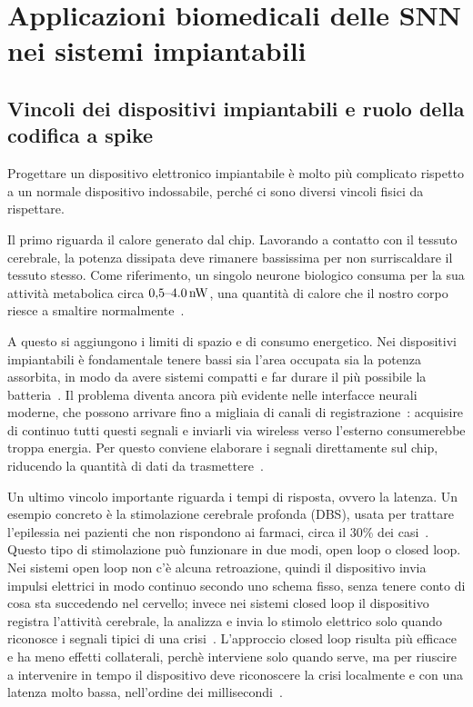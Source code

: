 \section[Applicazioni biomedicali impiantabili]{Applicazioni biomedicali delle SNN nei sistemi impiantabili}
\label{sec:applicazioni}

\subsection{Vincoli dei dispositivi impiantabili e ruolo della codifica a spike}
\label{subsec:vincoli_impiantabili}


Progettare un dispositivo elettronico impiantabile è molto più complicato rispetto a un normale dispositivo indossabile, perché ci sono diversi vincoli fisici da rispettare. 

Il primo riguarda il calore generato dal chip. Lavorando a contatto con il tessuto cerebrale, la potenza dissipata deve rimanere bassissima per non surriscaldare il tessuto stesso. Come riferimento, un singolo neurone biologico consuma per la sua attività metabolica circa $0{,}5\text{--}\SI{4{,}0}{\nano\watt}$, una quantità di calore che il nostro corpo riesce a smaltire normalmente~\cite{ronchini2023}. 

A questo si aggiungono i limiti di spazio e di consumo energetico. Nei dispositivi impiantabili è fondamentale tenere bassi sia l'area occupata sia la potenza assorbita, in modo da avere sistemi compatti e far durare il più possibile la batteria~\cite{ronchini2023, wu2026}. Il problema diventa ancora più evidente nelle interfacce neurali moderne, che possono arrivare fino a migliaia di canali di registrazione~\cite{wu2026}: acquisire di continuo tutti questi segnali e inviarli via wireless verso l'esterno consumerebbe troppa energia. Per questo conviene elaborare i segnali direttamente sul chip, riducendo la quantità di dati da trasmettere~\cite{ronchini2023, wu2026}.

Un ultimo vincolo importante riguarda i tempi di risposta, ovvero la latenza. Un esempio concreto è la stimolazione cerebrale profonda (DBS), usata per trattare l'epilessia nei pazienti che non rispondono ai farmaci, circa il 30\% dei casi~\cite{ronchini2023}. Questo tipo di stimolazione può funzionare in due modi, open loop o closed loop. Nei sistemi open loop non c'è alcuna retroazione, quindi il dispositivo invia impulsi elettrici in modo continuo secondo uno schema fisso, senza tenere conto di cosa sta succedendo nel cervello; invece nei sistemi closed loop il dispositivo registra l'attività cerebrale, la analizza e invia lo stimolo elettrico solo quando riconosce i segnali tipici di una crisi~\cite{ronchini2023}. L'approccio closed loop risulta più efficace e ha meno effetti collaterali, perchè interviene solo quando serve, ma per riuscire a intervenire in tempo il dispositivo deve riconoscere la crisi localmente e con una latenza molto bassa, nell'ordine dei millisecondi~\cite{ronchini2023}.


